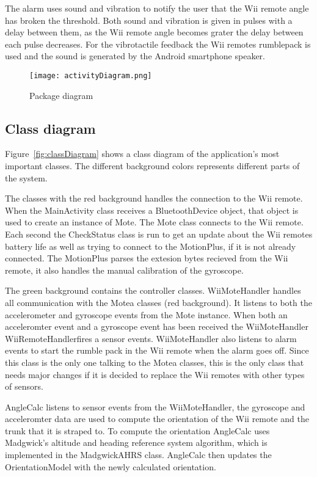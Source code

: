 The alarm uses sound and vibration to notify the user that the Wii remote angle has broken the threshold. Both sound and vibration is given in pulses with a delay between them, as the Wii remote angle becomes grater the delay between each pulse decreases. For the vibrotactile feedback the Wii remotes rumblepack is used and the sound is generated by the Android smartphone speaker. 


\begin{figure}[h!]
  \centering
    \texttt{[image: activityDiagram.png]}
    \caption{\footnotesize Package diagram}
    \label{fig:activityDiagram}
\end{figure}

\subsection{Class diagram}
Figure~\ref{fig:classDiagram} shows a class diagram of the application's most important classes. The different background colors represents different parts of the system.

The classes with the red background handles the connection to the Wii remote. When the MainActivity class receives a BluetoothDevice object, that object is used to create an instance of Mote. The Mote class connects to the Wii remote. Each second the CheckStatus class is run to get an update about the Wii remotes battery life as well as trying to connect to the MotionPlus, if it is not already connected. The MotionPlus parses the extesion bytes recieved from the Wii remote, it also handles the manual calibration of the gyroscope.

The green background contains the controller classes. WiiMoteHandler handles all communication with the Motea classes (red background). It listens to both the accelerometer and gyroscope events from the Mote instance. When both an acceleromter event and a gyroscope event has been received the WiiMoteHandler WiiRemoteHandlerfires a sensor events. WiiMoteHandler also listens to alarm events to start the rumble pack in the Wii remote when the alarm goes off. Since this class is the only one talking to the Motea classes, this is the only class that needs major changes if it is decided to replace the Wii remotes with other types of sensors. 

AngleCalc listens to sensor events from the WiiMoteHandler, the gyroscope and acceleromter data are used to compute the orientation of the Wii remote and the trunk that it is straped to. To compute the orientation AngleCalc uses Madgwick's altitude and heading reference system algorithm, which is implemented in the MadgwickAHRS class. AngleCalc then updates the OrientationModel with the newly calculated orientation.

